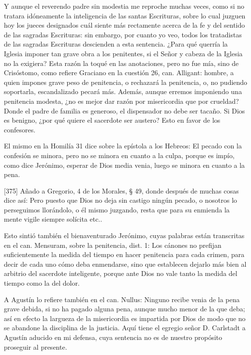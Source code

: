 Y aunque el reverendo padre sin modestia me reproche muchas veces, como si no tratara idóneamente la inteligencia de las santas Escrituras, sobre lo cual juzguen hoy los jueces designados cuál siente más rectamente acerca de la fe y del sentido de las sagradas Escrituras: sin embargo, por cuanto yo veo, todos los tratadistas de las sagradas Escrituras descienden a esta sentencia. ¿Para qué querría la Iglesia imponer tan grave obra a los penitentes, si el Señor y cabeza de la Iglesia no la exigiera? Esta razón la toqué en las anotaciones, pero no fue mía, sino de Crisóstomo, como refiere Graciano en la cuestión 26, can. Alligant: hombre, a quien impones grave peso de penitencia, o rechazará la penitencia, o, no pudiendo soportarla, escandalizado pecará más. Además, aunque erremos imponiendo una penitencia modesta, ¿no es mejor dar razón por misericordia que por crueldad? Donde el padre de familia es generoso, el dispensador no debe ser tacaño. Si Dios es benigno, ¿por qué quiere el sacerdote ser austero? Esto en favor de los confesores.

El mismo en la Homilía 31 dice sobre la epístola a los Hebreos: El pecado con la confesión se minora, pero no se minora en cuanto a la culpa, porque es impío, como dice Jerónimo, esperar de Dios media venia, luego se minora en cuanto a la pena.

[375] Añado a Gregorio, 4 de los Morales, § 49, donde después de muchas cosas dice así: Pero puesto que Dios no deja sin castigo ningún pecado, o nosotros lo perseguimos llorándolo, o él mismo juzgando, resta que para su enmienda la mente vigile siempre solícita etc..

Esto sintió también el bienaventurado Jerónimo, cuyas palabras están transcritas en el can. Mensuram, sobre la penitencia, dist. 1: Los cánones no prefijan suficientemente la medida del tiempo en hacer penitencia para cada crimen, para decir de cada uno cómo deba enmendarse, sino que establecen dejarlo más bien al arbitrio del sacerdote inteligente, porque ante Dios no vale tanto la medida del tiempo como la del dolor.

A Agustín lo refiere también en el can. Nullus: Ninguno recibe venia de la pena grave debida, si no ha pagado alguna pena, aunque mucho menor de la que deba; así en efecto la largueza de la misericordia es impartida por Dios de modo que no se abandone la disciplina de la justicia. Aquí tiene el egregio señor D. Carlstadt a Agustín aducido en mi defensa, cuya sentencia no es de nuestro propósito proseguir al presente.

